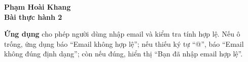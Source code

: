 \documentclass{article}
\begin{document}
\begin{center}
    \Large\textbf{Phạm Hoài Khang} \\[0.5cm]
    \textbf{Bài thực hành 2}
\end{center}

\noindent\textbf{Ứng dụng} cho phép người dùng nhập email và kiểm tra tính hợp lệ. Nếu ô trống, ứng dụng báo “Email không hợp lệ”; nếu thiếu ký tự “@”, báo “Email không đúng định dạng”; còn nếu đúng, hiển thị “Bạn đã nhập email hợp lệ”.
\end{document}
